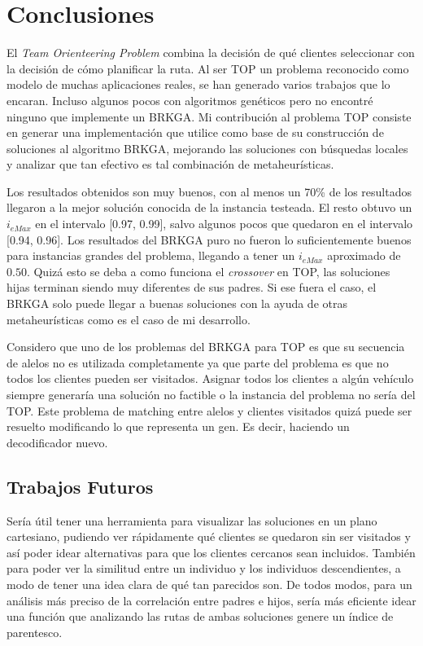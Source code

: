 \chapter{Conclusiones}

\bigskip

El \textit{Team Orienteering Problem} combina la decisión de qué clientes seleccionar con la decisión de cómo planificar la ruta. Al ser TOP un problema reconocido como modelo de muchas aplicaciones reales, se han generado varios trabajos que lo encaran. Incluso algunos pocos con algoritmos genéticos pero no encontré ninguno que implemente un BRKGA. Mi contribución al problema TOP consiste en generar una implementación que utilice como base de su construcción de soluciones al algoritmo BRKGA, mejorando las soluciones con búsquedas locales y analizar que tan efectivo es tal combinación de metaheurísticas.

\bigskip

Los resultados obtenidos son muy buenos, con al menos un 70\% de los resultados llegaron a la mejor solución conocida de la instancia testeada. El resto obtuvo un $i_{eMax}$ en el intervalo [0.97, 0.99], salvo algunos pocos que quedaron en el intervalo [0.94, 0.96]. Los resultados del BRKGA puro no fueron lo suficientemente buenos para instancias grandes del problema, llegando a tener un $i_{eMax}$ aproximado de $0.50$. Quizá esto se deba a como funciona el \textit{crossover} en TOP, las soluciones hijas terminan siendo muy diferentes de sus padres. Si ese fuera el caso, el BRKGA solo puede llegar a buenas soluciones con la ayuda de otras metaheurísticas como es el caso de mi desarrollo.

\bigskip

Considero que uno de los problemas del BRKGA para TOP es que su secuencia de alelos no es utilizada completamente ya que parte del problema es que no todos los clientes pueden ser visitados. Asignar todos los clientes a algún vehículo siempre generaría una solución no factible o la instancia del problema no sería del TOP. Este problema de matching entre alelos y clientes visitados quizá puede ser resuelto modificando lo que representa un gen. Es decir, haciendo un decodificador nuevo.

\section{Trabajos Futuros}

Sería útil tener una herramienta para visualizar las soluciones en un plano cartesiano, pudiendo ver rápidamente qué clientes se quedaron sin ser visitados y así poder idear alternativas para que los clientes cercanos sean incluidos. También para poder ver la similitud entre un individuo y los individuos descendientes, a modo de tener una idea clara de qué tan parecidos son. De todos modos, para un análisis más preciso de la correlación entre padres e hijos, sería más eficiente idear una función que analizando las rutas de ambas soluciones genere un índice de parentesco.

